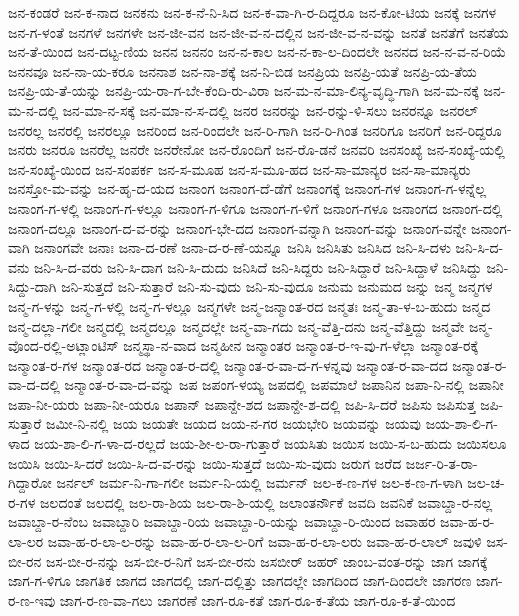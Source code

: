 {ಜನ-ಕಂಡರೆ
ಜನ-ಕ-ನಾದ
ಜನಕನು
ಜನ-ಕ-ನೆ-ನಿ-ಸಿದ
ಜನ-ಕ-ವಾ-ಗಿ-ರ-ದಿದ್ದರೂ
ಜನ-ಕೋ-ಟಿಯ
ಜನಕ್ಕೆ
ಜನಗಳ
ಜನ-ಗ-ಳಂತೆ
ಜನಗಳೆ
ಜನಗಳೇ
ಜನ-ಜೀ-ವನ
ಜನ-ಜೀ-ವ-ನ-ದಲ್ಲಿನ
ಜನ-ಜೀ-ವ-ನ-ವನ್ನು
ಜನತೆ
ಜನತೆಗೆ
ಜನತೆಯ
ಜನ-ತೆ-ಯಿಂದ
ಜನ-ದಟ್ಟ-ಣಿಯ
ಜನನ
ಜನನಂ
ಜನ-ನ-ಕಾಲ
ಜನ-ನ-ಕಾ-ಲ-ದಿಂದಲೇ
ಜನನದ
ಜನ-ನ-ವ-ನ-ರಿಯೆ
ಜನನವೂ
ಜನ-ನಾ-ಯ-ಕರೂ
ಜನನಾಶ
ಜನ-ನಾ-ಶಕ್ಕೆ
ಜನ-ನಿ-ಬಿಡ
ಜನಪ್ರಿಯ
ಜನಪ್ರಿ-ಯತೆ
ಜನಪ್ರಿ-ಯ-ತೆಯ
ಜನಪ್ರಿ-ಯ-ತೆ-ಯನ್ನು
ಜನಪ್ರಿ-ಯ-ರಾ-ಗ-ಬೇ-ಕೆಂದಿ-ರು-ವಿರಾ
ಜನ-ಮ-ನ-ಮಾ-ಲಿನ್ಯ-ವೃದ್ಧಿ-ಗಾಗಿ
ಜನ-ಮ-ನಕ್ಕೆ
ಜನ-ಮ-ನ-ದಲ್ಲಿ
ಜನ-ಮಾ-ನ-ಸಕ್ಕೆ
ಜನ-ಮಾ-ನ-ಸ-ದಲ್ಲಿ
ಜನರ
ಜನರನ್ನು
ಜನ-ರನ್ನು-ಳಿ-ಸಲು
ಜನರನ್ನೂ
ಜನರಲ್
ಜನರಲ್ಲ
ಜನರಲ್ಲಿ
ಜನರಲ್ಲೂ
ಜನರಿಂದ
ಜನ-ರಿಂದಲೇ
ಜನ-ರಿ-ಗಾಗಿ
ಜನ-ರಿ-ಗಿಂತ
ಜನರಿಗೂ
ಜನರಿಗೆ
ಜನ-ರಿದ್ದರೂ
ಜನರು
ಜನರೂ
ಜನರೆಲ್ಲ
ಜನರೇ
ಜನರೇನೋ
ಜನ-ರೊಂದಿಗೆ
ಜನ-ರೊ-ಡನೆ
ಜನವರಿ
ಜನಸಂಖ್ಯೆ
ಜನ-ಸಂಖ್ಯೆ-ಯಲ್ಲಿ
ಜನ-ಸಂಖ್ಯೆ-ಯಿಂದ
ಜನ-ಸಂಪರ್ಕ
ಜನ-ಸ-ಮೂಹ
ಜನ-ಸ-ಮೂ-ಹದ
ಜನ-ಸಾ-ಮಾನ್ಯರ
ಜನ-ಸಾ-ಮಾನ್ಯರು
ಜನಸ್ತೋ-ಮ-ವನ್ನು
ಜನ-ಹೃ-ದ-ಯದ
ಜನಾಂಗ
ಜನಾಂಗ-ದೆ-ಡೆಗೆ
ಜನಾಂಗಕ್ಕೆ
ಜನಾಂಗ-ಗಳ
ಜನಾಂಗ-ಗ-ಳನ್ನೆಲ್ಲ
ಜನಾಂಗ-ಗ-ಳಲ್ಲಿ
ಜನಾಂಗ-ಗ-ಳಲ್ಲೂ
ಜನಾಂಗ-ಗ-ಳಿಗೂ
ಜನಾಂಗ-ಗ-ಳಿಗೆ
ಜನಾಂಗ-ಗಳೂ
ಜನಾಂಗದ
ಜನಾಂಗ-ದಲ್ಲಿ
ಜನಾಂಗ-ದಲ್ಲೂ
ಜನಾಂಗ-ದ-ವ-ರನ್ನು
ಜನಾಂಗ-ಭೇ-ದದ
ಜನಾಂಗ-ವನ್ನಾಗಿ
ಜನಾಂಗ-ವನ್ನು
ಜನಾಂಗ-ವನ್ನೇ
ಜನಾಂಗ-ವಾಗಿ
ಜನಾಂಗವೇ
ಜನಾಃ
ಜನಾ-ದ-ರಣೆ
ಜನಾ-ದ-ರ-ಣೆ-ಯನ್ನೂ
ಜನಿಸಿ
ಜನಿಸಿತು
ಜನಿಸಿದ
ಜನಿ-ಸಿ-ದಳು
ಜನಿ-ಸಿ-ದ-ವನು
ಜನಿ-ಸಿ-ದ-ವರು
ಜನಿ-ಸಿ-ದಾಗ
ಜನಿ-ಸಿ-ದುದು
ಜನಿಸಿದೆ
ಜನಿ-ಸಿದ್ದರು
ಜನಿ-ಸಿದ್ದಾರೆ
ಜನಿ-ಸಿದ್ದಾಳೆ
ಜನಿಸಿದ್ದು
ಜನಿ-ಸಿದ್ದು-ದಾಗಿ
ಜನಿ-ಸುತ್ತದೆ
ಜನಿ-ಸುತ್ತಾರೆ
ಜನಿ-ಸು-ವುದು
ಜನಿ-ಸು-ವುದೂ
ಜನುಮ
ಜನುಮದ
ಜನ್ನು
ಜನ್ಮ
ಜನ್ಮಗಳ
ಜನ್ಮ-ಗ-ಳನ್ನು
ಜನ್ಮ-ಗ-ಳಲ್ಲಿ
ಜನ್ಮ-ಗ-ಳಲ್ಲೂ
ಜನ್ಮಗಳೇ
ಜನ್ಮ-ಜನ್ಮಾಂತ-ರದ
ಜನ್ಮತಃ
ಜನ್ಮ-ತಾ-ಳ-ಬ-ಹುದು
ಜನ್ಮದ
ಜನ್ಮ-ದಲ್ಲಾ-ಗಲೀ
ಜನ್ಮದಲ್ಲಿ
ಜನ್ಮದಲ್ಲೂ
ಜನ್ಮದಲ್ಲೇ
ಜನ್ಮ-ವಾ-ಗದು
ಜನ್ಮ-ವೆತ್ತಿ-ದನು
ಜನ್ಮ-ವೆತ್ತಿದ್ದು
ಜನ್ಮವೇ
ಜನ್ಮ-ವೊಂದ-ರಲ್ಲಿ-ಅಟ್ಲಾಂಟಿಸ್
ಜನ್ಮಸ್ಥಾ-ನ-ವಾದ
ಜನ್ಮಹೀನ
ಜನ್ಮಾಂತರ
ಜನ್ಮಾಂತ-ರ-ಇ-ವು-ಗ-ಳೆಲ್ಲಾ
ಜನ್ಮಾಂತ-ರಕ್ಕೆ
ಜನ್ಮಾಂತ-ರ-ಗಳ
ಜನ್ಮಾಂತ-ರದ
ಜನ್ಮಾಂತ-ರ-ದಲ್ಲಿ
ಜನ್ಮಾಂತ-ರ-ವಾ-ದ-ಗ-ಳನ್ನವು
ಜನ್ಮಾಂತ-ರ-ವಾ-ದದ
ಜನ್ಮಾಂತ-ರ-ವಾ-ದ-ದಲ್ಲಿ
ಜನ್ಮಾಂತ-ರ-ವಾ-ದ-ವನ್ನು
ಜಪ
ಜಪಂಗ-ಳಯ್ಯ
ಜಪದಲ್ಲಿ
ಜಪಮಾಲೆ
ಜಪಾನಿನ
ಜಪಾ-ನಿ-ನಲ್ಲಿ
ಜಪಾನೀ
ಜಪಾ-ನೀ-ಯರು
ಜಪಾ-ನೀ-ಯರೂ
ಜಪಾನ್
ಜಪಾನ್ದೇ-ಶದ
ಜಪಾನ್ದೇ-ಶ-ದಲ್ಲಿ
ಜಪಿ-ಸಿ-ದರೆ
ಜಪಿಸು
ಜಪಿಸುತ್ತ
ಜಪಿ-ಸುತ್ತಾರೆ
ಜಮೀ-ನಿ-ನಲ್ಲಿ
ಜಯ
ಜಯತೇ
ಜಯದ
ಜಯ-ನ-ಗರ
ಜಯಭೇರಿ
ಜಯವನ್ನು
ಜಯವು
ಜಯ-ಶಾ-ಲಿ-ಗ-ಳಾದ
ಜಯ-ಶಾ-ಲಿ-ಗ-ಳಾ-ದ-ರಲ್ಲದೆ
ಜಯ-ಶೀ-ಲ-ರಾ-ಗುತ್ತಾರೆ
ಜಯಸಿತು
ಜಯಿಸ
ಜಯಿ-ಸ-ಬ-ಹುದು
ಜಯಿಸಲೂ
ಜಯಿಸಿ
ಜಯಿ-ಸಿ-ದರೆ
ಜಯಿ-ಸಿ-ದ-ವ-ರನ್ನು
ಜಯಿ-ಸುತ್ತದೆ
ಜಯಿ-ಸು-ವುದು
ಜರುಗ
ಜರೆದ
ಜರ್ಜ-ರಿ-ತ-ರಾ-ಗಿದ್ದಾರೋ
ಜರ್ನಲ್
ಜರ್ಮ-ನಿ-ಗಾ-ಗಲೀ
ಜರ್ಮ-ನಿ-ಯಲ್ಲಿ
ಜರ್ಮನ್
ಜಲ-ಕ-ಣ-ಗಳ
ಜಲ-ಕ-ಣ-ಗ-ಳಾಗಿ
ಜಲ-ಚ-ರ-ಗಳ
ಜಲದಂತೆ
ಜಲದಲ್ಲಿ
ಜಲ-ರಾ-ಶಿಯ
ಜಲ-ರಾ-ಶಿ-ಯಲ್ಲಿ
ಜಲಾಂತರ್ನೌಕೆ
ಜವದಿ
ಜವನಿಕೆ
ಜವಾಬ್ದಾ-ರ-ನಲ್ಲ
ಜವಾಬ್ದಾ-ರ-ನೆಂಬ
ಜವಾಬ್ದಾರಿ
ಜವಾಬ್ದಾ-ರಿಯ
ಜವಾಬ್ದಾ-ರಿ-ಯನ್ನು
ಜವಾಬ್ದಾ-ರಿ-ಯಿಂದ
ಜವಾಹರ
ಜವಾ-ಹ-ರ-ಲಾ-ಲರ
ಜವಾ-ಹ-ರ-ಲಾ-ಲ-ರನ್ನು
ಜವಾ-ಹ-ರ-ಲಾ-ಲ-ರಿಗೆ
ಜವಾ-ಹ-ರ-ಲಾ-ಲರು
ಜವಾ-ಹ-ರ-ಲಾಲ್
ಜವುಳಿ
ಜಸ-ಬೀ-ರನ
ಜಸ-ಬೀ-ರ-ನನ್ನು
ಜಸ-ಬೀ-ರ-ನಿಗೆ
ಜಸ-ಬೀ-ರನು
ಜಸಬೀರ್
ಜಹರ್
ಜಾಂಬ-ವಂತ-ರನ್ನು
ಜಾಗ
ಜಾಗಕ್ಕೆ
ಜಾಗ-ಗ-ಳಿಗೂ
ಜಾಗತಿಕ
ಜಾಗದ
ಜಾಗದಲ್ಲಿ
ಜಾಗ-ದಲ್ಲಿತ್ತು
ಜಾಗದಲ್ಲೇ
ಜಾಗದಿಂದ
ಜಾಗ-ದಿಂದಲೇ
ಜಾಗರಣ
ಜಾಗ-ರ-ಣ-ಇವು
ಜಾಗ-ರ-ಣ-ವಾ-ಗಲು
ಜಾಗರಣೆ
ಜಾಗ-ರೂ-ಕತೆ
ಜಾಗ-ರೂ-ಕ-ತೆಯ
ಜಾಗ-ರೂ-ಕ-ತೆ-ಯಿಂದ
}
